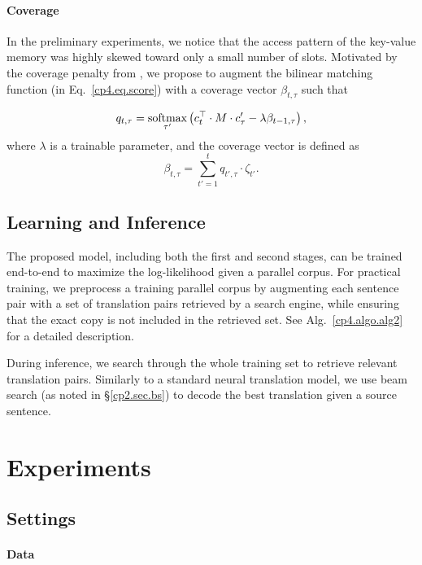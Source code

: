 \paragraph{Coverage}

In the preliminary experiments, we notice that the access pattern of the key-value memory was highly skewed toward only a small number of slots. Motivated by the coverage penalty from \citep{tu2016modeling}, we propose to augment the bilinear matching function (in Eq.~\eqref{cp4.eq.score}) with a coverage vector $\beta_{t,\tau}$ such that

\begin{align}
\label{cp4.eq.match}
     q_{t, \tau}  = \mathop{\operatorname{\text{softmax}}}\limits_{\tau'}\left(c_t^\top \cdot M \cdot c'_\tau - \lambda \beta_{t-1, \tau}\right),
\end{align}
where  $\lambda$ is a trainable parameter, and the coverage vector is defined as 
\begin{equation}
	 \beta_{t, \tau}= \sum_{t'=1}^t q_{t', \tau}\cdot\zeta_{t'}.
\end{equation}

\subsection{Learning and Inference}
The proposed model, including both the first and second stages, can be trained end-to-end to maximize the log-likelihood given a parallel corpus. For practical training, we preprocess a training parallel corpus by augmenting each sentence pair with a set of translation pairs retrieved by a search engine, while ensuring that the exact copy is not included in the retrieved set. See Alg.~\ref{cp4.algo.alg2} for a detailed description. 

During inference, we search through the whole training set to retrieve relevant translation pairs. Similarly to a standard neural translation model, we use beam search (as noted in \S\ref{cp2.sec.bs})  to decode the best translation given a source sentence. 


\section{Experiments}
\subsection{Settings}
\paragraph{Data}

